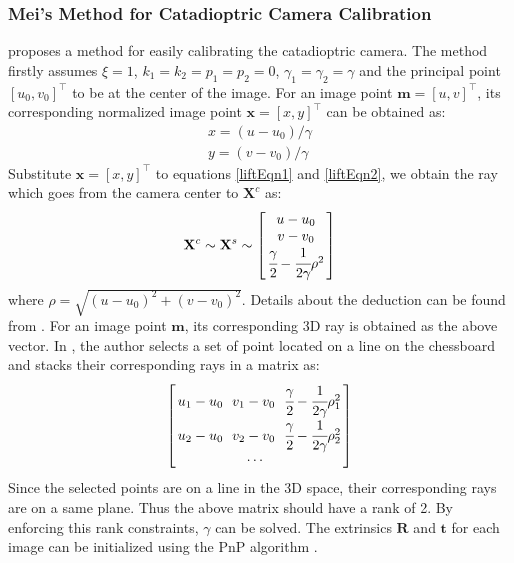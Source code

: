 \documentclass{report}
\begin{document}
\subsubsection{Mei's Method for Catadioptric Camera Calibration}
\cite{mei2007single} proposes a method for easily calibrating the catadioptric camera. The method firstly assumes $\xi = 1$, $k_1 = k_2 = p_1 = p_2 = 0$, $\gamma_1 = \gamma_2 = \gamma$ and the principal point $[u_0, v_0]^\top$ to be at the center of the image. For an image point $\mathbf{m} = [u, v]^\top$, its corresponding normalized image point $\mathbf{x} = [x, y]^\top$ can be obtained as:
\begin{eqnarray}
x = (u - u_0) / \gamma \\
y = (v - v_0) / \gamma
\end{eqnarray}
Substitute $\mathbf{x} = [x, y]^\top$ to equations \ref{liftEqn1} and \ref{liftEqn2}, we obtain the ray which goes from the camera center to $\mathbf{X}^c$ as: 
\begin{equation}
\mathbf{X}^c \sim \mathbf{X}^s \sim
\arraycolsep=1.5pt%
\begin{bmatrix}
	\begin{array}{c}
	u - u_0 \\ v - v_0 \\ \cfrac{\gamma}{2} - \cfrac{1}{2 \gamma} \rho^2
	\end{array}
\end{bmatrix} 
\label{meiRayEqn}
\end{equation}
where $\rho = \sqrt{(u - u_0)^2 + (v - v_0)^2}$. Details about the deduction can be found from \cite{mei2007single}. For an image point $\mathbf{m}$, its corresponding 3D ray is obtained as the above vector. In \cite{mei2007single}, the author selects a set of point located on a line on the chessboard and stacks their corresponding rays in a matrix as:
\begin{equation}
\arraycolsep=1.5pt%
\begin{bmatrix}
	\begin{array}{ccc}
	u_1 - u_0\  & v_1 - v_0\  & \cfrac{\gamma}{2} - \cfrac{1}{2 \gamma} \rho_1^2 \\
	u_2 - u_0\  & v_2 - v_0\  & \cfrac{\gamma}{2} - \cfrac{1}{2 \gamma} \rho_2^2 \\
	&\cdots	&
	\end{array}
\end{bmatrix} 
\end{equation}  
Since the selected points are on a line in the 3D space, their corresponding rays are on a same plane. Thus the above matrix should have a rank of 2. By enforcing this rank constraints, $\gamma$ can be solved. The extrinsics $\mathbf{R}$ and $\mathbf{t}$ for each image can be initialized using the PnP algorithm \cite{gao2003complete}. 
\end{document}
